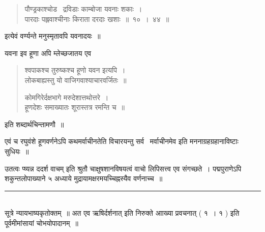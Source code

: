 \documentclass[11pt, openany]{book}
\makeatletter
\newcommand{\devanagarinumeral}[1]{
\devanagaridigits{\number \csname c@#1\endcsname}} %
\makeatother
\begin{document}
\begin{multicols}{2}
\begin{quote}
{पौण्ड्रकाश्चोड \textendash\ द्रविडाः काम्बोजा यवनाः शकाः~।\\
पारदाः पह्लवाश्चीनाः किराता दरदाः खशाः~॥~१०~।~४४~॥}
\end{quote}

इत्येवं वर्ण्यन्ते मनुस्मृतावपि यवनादयः~॥

यवना इव हूणा अपि म्लेच्छजातय एव

\begin{quote}
{\qt श्वपाकश्च तुरुष्कश्च हूणो यवन इत्यपि~।\\
लोकबाह्यस्तु यो वाजिगवाश्याचारवर्जितः~॥

कोमगिरेर्दक्षभागे मरुदेशात्तथोत्तरे~।\\
हूणदेशः समाख्यातः शूरास्तत्र रमन्ति च~॥}
\end{quote}

\noindent
इति शब्दार्थचिन्तामणौ~॥ 

एवं च रघुवंशे हूणवर्णनेऽपि कथमर्वाचीनतेति विचारयन्तु {\qt सर्व \textendash\ मर्वाचीनमेव} इति मननाग्रहग्रहानाविष्टाः सुधियः~॥

{\qt उतत्वः प्ष्यन्न ददर्श वाचम्} इति श्रुतौ चाक्षुषशानविषयत्वं वाचो लिपिसत्त्व एव संगच्छते~। पद्मपुराणेऽपि शकुन्तलोपाख्याने ५ अध्याये मुद्रायामक्षरमयच्चिह्नस्यैव वर्णनाच्च~॥

\noindent
\rule{1\linewidth}{0.5pt}\\

\noindent
सूत्रे न्यायभाष्यकृतोक्तम्~॥ अत एव {\qt ऋषिर्दर्शनात्} इति निरुक्ते {\qt आाख्या प्रवचनात्} ( १~। १ ) इति पूर्वमीमांसायां चोभयोपादानम्~॥
\end{multicols}

\fancyhead[RO,LE]{\thepage}
\cfoot{}
\newpage
\renewcommand{\thepage}{\devanagarinumeral{page}}
\setcounter{page}{7}
\end{document}

